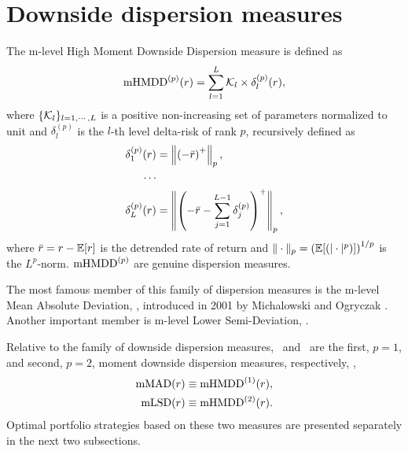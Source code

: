 
\section{Downside dispersion measures}\label{mHMDD}

The m-level High Moment Downside Dispersion measure is defined as
\begin{equation}
    \mHMDD^{(p)}(r) = \sum_{l=1}^L \cK_l \times \delta^{(p)}_l(r),
    \label{hmdd1}
\end{equation}
where $\{{\cal K}_l\}_{l=1,\cdots,L}$ is a positive non-increasing set of parameters normalized to unit
and $\delta^{(p)}_l$ is the $l$-th level delta-risk of rank $p$, recursively defined as
\begin{align}
    \delta^{(p)}_1(r) &= \left\| \left( -\br \right)^+ \right\|_p, \label{hmdd3} \\
    \cdots & \nonumber \\
    \delta^{(p)}_L(r)  &= \left\| \left( -\br - \sum_{j=1}^{L-1} \delta^{(p)}_j \right)^+ \right\|_p, \label{hmdd2}
\end{align}
where ${\bar r} = r - {\mathbb E}[r]$ is the detrended rate of return and
$\|\cdot\|_p= \left({\mathbb E}[(|\cdot|^p)]\right)^{1/p}$ is the $L^p$-norm.
${\rm mHMDD}^{(p)}$ are genuine dispersion measures.

The most famous member of this family of dispersion measures is the m-level Mean Absolute Deviation, \mMAD,
introduced in 2001 by Michalowski and Ogryczak \cite{Ogryczak}.
Another important member is m-level Lower Semi-Deviation, \mLSD.

Relative to the family of downside dispersion measures, \mMAD\ and \mLSD\ are the first, $p=1$, and
second, $p=2$, moment downside dispersion measures, respectively, \ie,
\begin{align}
    \mMAD(r) &\equiv \mHMDD^{(1)}(r), \label{hmdd4} \\
    \mLSD(r) &\equiv \mHMDD^{(2)}(r). \label{hmdd5}
\end{align}
Optimal portfolio strategies based on these two measures are presented separately in the next two subsections.

\BackToContents



